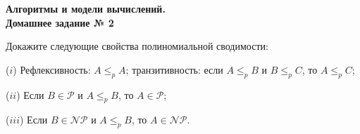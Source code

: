 \documentclass[a4paper,12pt]{article}
\begin{document}
	
	\thispagestyle{firstpage}
	
	\begin{center}
		\textbf{\Large{Алгоритмы и модели вычислений. \\ Домашнее задание № 2}}
	\end{center}


\begin{tasknum}{1}
	Докажите следующие свойства полиномиальной сводимости:
	
	($i$) Рефлексивность: $A\leq_p A$; транзитивность: если $A\leq_p B$ и $B\leq_p C$, то $A\leq_p C$;
	
	($ii$) Если $B\in\mathcal{P}$ и $A\leq_p B$, то $A\in\mathcal{P}$;
	
	($iii$) Если $B\in\mathcal{NP}$ и $A\leq_p B$, то $A\in\mathcal{NP}$.
\end{tasknum}
\end{document}
